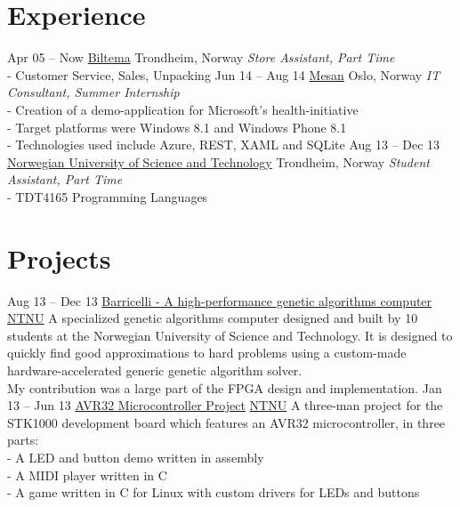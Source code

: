 \documentclass[print]{friggeri-cv}
\begin{document}
\section{Experience}

\begin{entrylist}
    \entry
        {Apr 05 – Now}
        {\href{http://biltema.no/}{Biltema}}
        {Trondheim, Norway}
        {\emph{Store Assistant, Part Time}\\
        - Customer Service, Sales, Unpacking}
    \entry
        {Jun 14 – Aug 14}
        {\href{http://mesan.no/}{Mesan}}
        {Oslo, Norway}
        {\emph{IT Consultant, Summer Internship}\\
         - Creation of a demo-application for Microsoft's health-initiative\\
         - Target platforms were Windows 8.1 and Windows Phone 8.1\\
         - Technologies used include Azure, REST, XAML and SQLite}
    \entry
        {Aug 13 – Dec 13}
        {\href{http://ntnu.no/}{Norwegian University of Science and Technology}}
        {Trondheim, Norway}
        {\emph{Student Assistant, Part Time}\\
        - TDT4165 Programming Languages}
\end{entrylist}

\section{Projects}

\begin{entrylist}
    \entry
        {Aug 13 – Dec 13}
        {\href{http://barricel.li/}{Barricelli - A high-performance genetic algorithms computer}}
        {\href{http://ntnu.no/}{NTNU}}
        {A specialized genetic algorithms computer designed and built by 10 students at the Norwegian University of Science and Technology. It is designed to quickly find good approximations to hard problems using a custom-made hardware-accelerated generic genetic algorithm solver.\\
        My contribution was a large part of the FPGA design and implementation.}
    \entry
        {Jan 13 – Jun 13}
        {\href{https://github.com/lundal/avr32-project-2013}{AVR32 Microcontroller Project}}
        {\href{http://ntnu.no/}{NTNU}}
        {A three-man project for the STK1000 development board which features an AVR32 microcontroller, in three parts:\\
        - A LED and button demo written in assembly\\
        - A MIDI player written in C\\
        - A game written in C for Linux with custom drivers for LEDs and buttons}
\end{entrylist}
\end{document}
